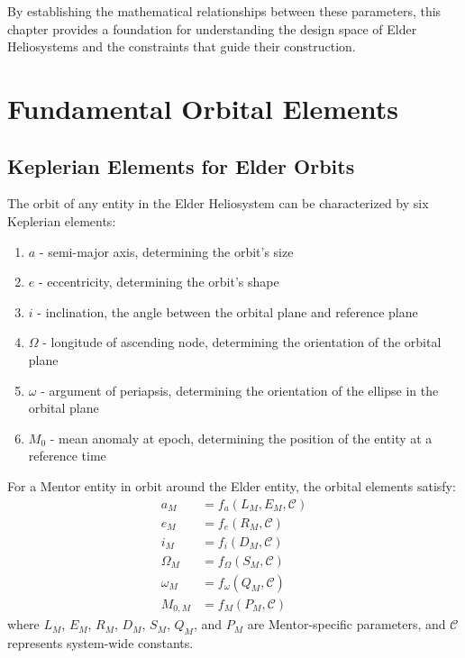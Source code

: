 By establishing the mathematical relationships between these parameters, this chapter provides a foundation for understanding the design space of Elder Heliosystems and the constraints that guide their construction.

\section{Fundamental Orbital Elements}

\subsection{Keplerian Elements for Elder Orbits}

\begin{definition}
The orbit of any entity in the Elder Heliosystem can be characterized by six Keplerian elements:
\begin{enumerate}
    \item $a$ - semi-major axis, determining the orbit's size
    \item $e$ - eccentricity, determining the orbit's shape
    \item $i$ - inclination, the angle between the orbital plane and reference plane
    \item $\Omega$ - longitude of ascending node, determining the orientation of the orbital plane
    \item $\omega$ - argument of periapsis, determining the orientation of the ellipse in the orbital plane
    \item $M_0$ - mean anomaly at epoch, determining the position of the entity at a reference time
\end{enumerate}
\end{definition}

\begin{theorem}
For a Mentor entity in orbit around the Elder entity, the orbital elements satisfy:
\begin{align}
a_M &= f_a(L_M, E_M, \mathcal{C}) \\
e_M &= f_e(R_M, \mathcal{C}) \\
i_M &= f_i(D_M, \mathcal{C}) \\
\Omega_M &= f_{\Omega}(S_M, \mathcal{C}) \\
\omega_M &= f_{\omega}(Q_M, \mathcal{C}) \\
M_{0,M} &= f_M(P_M, \mathcal{C})
\end{align}
where $L_M$, $E_M$, $R_M$, $D_M$, $S_M$, $Q_M$, and $P_M$ are Mentor-specific parameters, and $\mathcal{C}$ represents system-wide constants.
\end{theorem}

